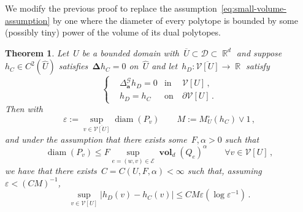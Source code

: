 \documentclass[12pt]{amsart}
\numberwithin{equation}{section}
\DeclareMathOperator{\R}{\mathbb{R}}
\DeclareMathOperator{\diam}{{\mathop{diam}}}
\newtheorem{theorem}{Theorem}[section]
\newcommand{\V}{\mathcal{V}}
\newcommand{\E}{\mathcal{E}}
\newcommand{\eps}{\varepsilon}
\newcommand{\CLap}{\boldsymbol{\Delta}}
\newcommand{\aDelta}{\hyperref[eq:geometric-laplacian]{{\Delta^{\mathcal{G}}_{\cond}}}}
\newcommand{\cond}{\hyperref[eq:geometric-laplacian]{\mathbf{a}}}
\newcommand{\GCU}{\hyperref[eq:graph-closure]{\widehat{U}}}
\newcommand{\Qe}{\hyperref[eq:qeset]{Q_e}}
\DeclareMathOperator{\vol}{\mathbf{vol}}
\begin{document}
We modify the previous proof to replace the assumption~\eqref{eq:small-volume-assumption} by one
where the diameter of every polytope is bounded by some (possibly tiny) power of the volume of its dual polytopes. 
\begin{theorem}
	\label{theorem:generaldim-decay}
	Let~$U$ be a bounded domain with~$\overline{U} \subset \mathcal{D} \subset \R^d$ and suppose~$h_C \in C^{2}(\GCU)$ satisfies~$\CLap h_C = 0$ on~$\GCU$ and let~$h_D: \overline{\V[U]} \to \R$ satisfy 
	\[
	\left\{
	\begin{aligned}
		&  \aDelta h_D = 0 & \mbox{in} & \ \V[U] \,,
		\\
		& h_D = h_C & \mbox{on} & \  \partial \V[U] \, . 
	\end{aligned}
	\right.
	\]
	Then with
	\[
	\eps := \sup_{v \in \overline{\V[U]}} \diam(P_v) \quad \quad M := M_U^\circ(h_C) \vee 1 \, , 
	\]
	and under the assumption that there exists some~$F, \alpha > 0$ such that
	\begin{equation}
		\label{eq:decay-of-stuff}
		\diam(P_v) \leq  F \sup_{e = (w,v) \in \E} \vol_{d}(\Qe)^{\alpha} \qquad \forall v \in \V[U] \, ,  
	\end{equation}
	we have that there exists~$C=C(U, F, \alpha) < \infty$ such that, assuming~{$\eps  < (C M)^{-1}$},
	\begin{equation} 
		\label{eq:full-bound-decay-of-stuff}
		\sup_{v \in \V[U]} | h_D(v) - h_C(v) | \leq {C M \eps (\log \eps^{-1})}  \, . 
	\end{equation}
\end{theorem}
\end{document}
